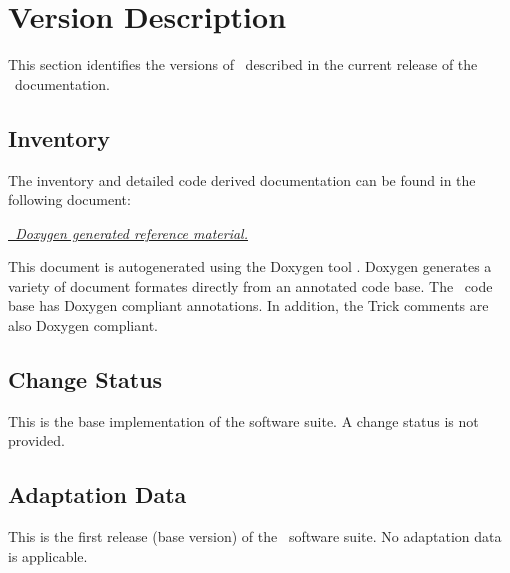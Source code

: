 %
%
%
\chapter{Version Description}\label{sec:versions}
This section identifies the versions of
\TrickHLA\ described in the current release of the \TrickHLA\ documentation.
 
\section{Inventory}
The inventory and detailed code derived documentation can be found in the
following document:
 
\href{file:refman.pdf}
           {\em \TrickHLA\ Doxygen generated reference material.}

This document is autogenerated using the Doxygen tool \cite{Doxygen}.
Doxygen generates a variety of document formates directly from an annotated
code base. The \TrickHLA\ code base has Doxygen compliant annotations. In
addition, the Trick comments are also Doxygen compliant.

\section{Change Status}
This is the base implementation of the software suite. A change
status is not provided.
 
\section{Adaptation Data}
This is the first release (base version) of the \TrickHLA\ software suite.
No adaptation data is applicable.
 
